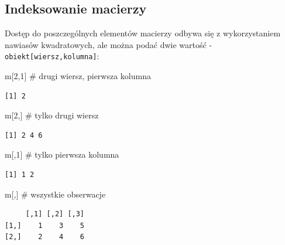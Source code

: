 \documentclass[
  letterpaper,
  DIV=11,
  numbers=noendperiod]{scrreprt}
\newenvironment{Shaded}{\begin{snugshade}}{\end{snugshade}}
\newcommand{\CommentTok}[1]{\textcolor[rgb]{0.37,0.37,0.37}{#1}}
\newcommand{\DecValTok}[1]{\textcolor[rgb]{0.68,0.00,0.00}{#1}}
\newcommand{\NormalTok}[1]{\textcolor[rgb]{0.00,0.23,0.31}{#1}}
\begin{document}
\hypertarget{indeksowanie-macierzy}{%
\subsection{Indeksowanie macierzy}\label{indeksowanie-macierzy}}

Dostęp do poszczególnych elementów macierzy odbywa się z wykorzystaniem
nawiasów kwadratowych, ale można podać dwie wartość -
\texttt{obiekt{[}wiersz,kolumna{]}}:

\begin{Shaded}
\begin{Highlighting}[]
\NormalTok{m[}\DecValTok{2}\NormalTok{,}\DecValTok{1}\NormalTok{] }\CommentTok{\# drugi wiersz, pierwsza kolumna}
\end{Highlighting}
\end{Shaded}

\begin{verbatim}
[1] 2
\end{verbatim}

\begin{Shaded}
\begin{Highlighting}[]
\NormalTok{m[}\DecValTok{2}\NormalTok{,]  }\CommentTok{\# tylko drugi wiersz}
\end{Highlighting}
\end{Shaded}

\begin{verbatim}
[1] 2 4 6
\end{verbatim}

\begin{Shaded}
\begin{Highlighting}[]
\NormalTok{m[,}\DecValTok{1}\NormalTok{]  }\CommentTok{\# tylko pierwsza kolumna}
\end{Highlighting}
\end{Shaded}

\begin{verbatim}
[1] 1 2
\end{verbatim}

\begin{Shaded}
\begin{Highlighting}[]
\NormalTok{m[,]   }\CommentTok{\# wszystkie obserwacje}
\end{Highlighting}
\end{Shaded}

\begin{verbatim}
     [,1] [,2] [,3]
[1,]    1    3    5
[2,]    2    4    6
\end{verbatim}
\end{document}
